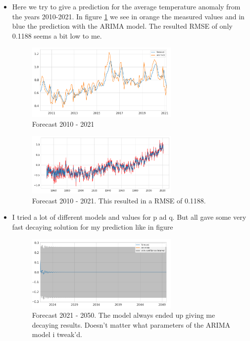 \documentclass[]{article}
\begin{document}
\begin{itemize}
		
		\item Here we try to give a prediction for the average temperature anomaly from the years 2010-2021. In figure \ref{fig:forecast_2010-2021} we see in orange the measured values and in blue the prediction with the ARIMA model.
		The resulted RMSE of only 0.1188 seems a bit low to me.
		\begin{figure}
			\centering
			\includegraphics[width=0.7\textwidth]{images/forecast_2010-2021.png}
			\caption{Forecast 2010 - 2021}
			\label{fig:forecast_2010-2021}
		\end{figure}
		\begin{figure}
			\centering
			\includegraphics[width=0.7\textwidth]{images/forecast_2010-2021_RMSE.png}
			\caption{Forecast 2010 - 2021. This resulted in a RMSE of 0.1188.}
			\label{fig:forecast_2010-2021_RMSE}
		\end{figure}
		\item I tried a lot of different models and values for p ad q. But all gave some very fast decaying solution for my prediction like in figure 
		\begin{figure}
			\centering
			\includegraphics[width=0.7\textwidth]{images/forecast_2021-2050.png}
			\caption{Forecast 2021 - 2050. The model always ended up giving me decaying results. Doesn't matter what parameters of the ARIMA model i tweak'd.}
			\label{fig:forecast_2021-2050}
		\end{figure}
	\end{itemize}
\end{document}
